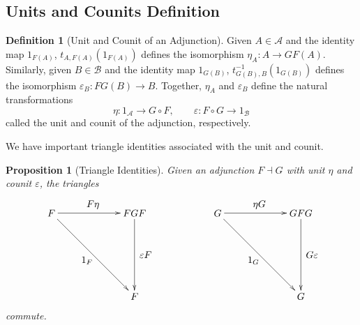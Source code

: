 \documentclass[11pt]{article}
\theoremstyle{definition}
\newtheorem*{defn}{Definition}
\theoremstyle{definition}
\theoremstyle{plain}
\theoremstyle{plain}
\newtheorem{prop}{Proposition}
\theoremstyle{plain}
\begin{document}
 \subsection*{Units and Counits Definition}

 \begin{defn}[Unit and Counit of an Adjunction]
 Given $A \in \mathscr{A}$ and the identity map $1_{F(A)}$, $t_{A,F(A)}(1_{F(A)})$ defines the isomorphism $\eta_{A}: A \to GF(A)$. Similarly, given $B \in \mathscr{B}$ and the identity map $1_{G(B)}$, $t^{-1}_{G(B),B}(1_{G(B)})$ defines the isomorphism $\varepsilon_{B}: FG(B) \to B$. Together, $\eta_{A}$ and $\varepsilon_{B}$ define the natural transformations
 \begin{equation*}
 \eta: 1_{\mathscr{A}} \to G \circ F, \qquad \varepsilon: F \circ G \to 1_{\mathscr{B}}
 \end{equation*}
 called the unit and counit of the adjunction, respectively.
 \end{defn}

We have important triangle identities associated with the unit and counit.

\begin{prop}[Triangle Identities]
Given an adjunction $F \dashv G$ with unit $\eta$ and counit $\varepsilon$, the triangles

\begin{equation*}
\begin{xy}
(0,0)*+{F}="f1"; (30,0)*+{FGF}="fgf"; (30,-30)*+{F}="f2";
(60,0)*+{G}="g1"; (90,0)*+{GFG}="gfg"; (90, -30)*+{G}="g2";
{\ar "f1";"fgf"}?*!/_3mm/{F\eta}; {\ar "fgf";"f2"}?*!/_4mm/{\varepsilon F}; {\ar "f1";"f2"}?*!/^3mm/{1_{F}};
{\ar "g1";"gfg"}?*!/_3mm/{\eta G}; {\ar "gfg";"g2"}?*!/_4mm/{G \varepsilon}; {\ar "g1";"g2"}?*!/^3mm/{1_{G}};
\end{xy}
\end{equation*}
commute.
\end{prop}
\end{document}
